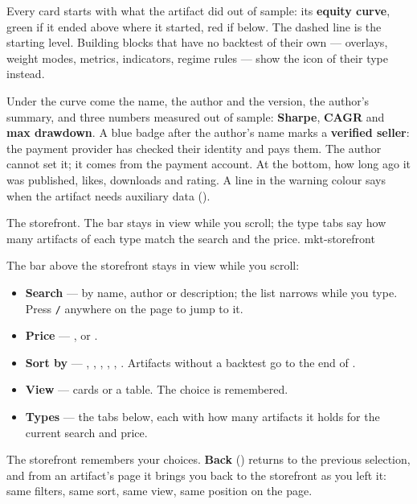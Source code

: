Every card starts with what the artifact did out of sample: its
\textbf{equity curve}, green if it ended above where it started, red if
below. The dashed line is the starting level. Building blocks that have no
backtest of their own --- overlays, weight modes, metrics, indicators,
regime rules --- show the icon of their type instead.

Under the curve come the name, the author and the version, the author's
summary, and three numbers measured out of sample: \textbf{Sharpe},
\textbf{CAGR} and \textbf{max drawdown}. A blue badge after the author's
name marks a \textbf{verified seller}: the payment provider has checked their
identity and pays them. The author cannot set it; it comes from the payment
account. At the bottom, how long ago it was
published, likes, downloads and rating. A line in the warning colour says
when the artifact needs auxiliary data ().

  {The storefront. The bar stays in view while you scroll; the type tabs say
   how many artifacts of each type match the search and the price.}
  {mkt-storefront}

\noindent
The bar above the storefront stays in view while you scroll:

\begin{itemize}
  \item \textbf{Search} --- by name, author or description; the list
        narrows while you type. Press \texttt{/} anywhere on the page to
        jump to it.
  \item \textbf{Price} --- ,  or .
  \item \textbf{Sort by} --- , ,
        , , ,
        . Artifacts without a backtest go to the end of
        .
  \item \textbf{View} --- cards or a table. The choice is remembered.
  \item \textbf{Types} --- the tabs below, each with how many artifacts it
        holds for the current search and price.
\end{itemize}

\noindent
The storefront remembers your choices. \textbf{Back}
() returns to the previous selection, and from an artifact's
page it brings you back to the storefront as you left it: same filters, same
sort, same view, same position on the page.

